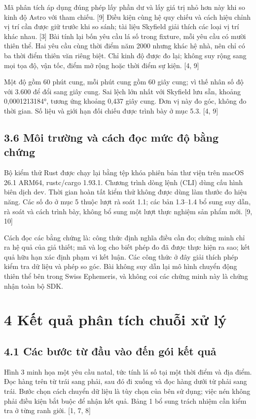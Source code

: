 \documentclass[11pt,a4paper]{article}
\begin{document}
Mã phân tích áp dụng đúng phép lấy phần dư và lấy giá trị nhỏ hơn này khi so kinh độ Astro với tham chiếu. [9] Điều kiện cùng hệ quy chiếu và cách hiệu chỉnh vị trí cần được giữ trước khi so sánh; tài liệu Skyfield giải thích các loại vị trí khác nhau. [3] Bài tính lại bốn yêu cầu lá số trong fixture, mỗi yêu cầu có mười thiên thể. Hai yêu cầu cùng thời điểm năm 2000 nhưng khác hệ nhà, nên chỉ có ba thời điểm thiên văn riêng biệt. Chỉ kinh độ được đo lại; không suy rộng sang mọi tọa độ, vận tốc, điểm mở rộng hoặc thời điểm sự kiện. [4, 9]


Một độ gồm 60 phút cung, mỗi phút cung gồm 60 giây cung; vì thế nhân số độ với 3.600 để đổi sang giây cung. Sai lệch lớn nhất với Skyfield lưu sẵn, khoảng 0,0001213184°, tương ứng khoảng 0,437 giây cung. Đơn vị này đo góc, không đo thời gian. Số liệu và giới hạn đối chiếu được trình bày ở mục 5.3. [4, 9]


\subsection*{3.6 Môi trường và cách đọc mức độ bằng chứng}
Bộ kiểm thử Rust được chạy lại bằng tệp khóa phiên bản thư viện trên macOS 26.1 ARM64, rustc/\allowbreak{}cargo 1.93.1. Chương trình dòng lệnh (CLI) dùng cấu hình biên dịch dev. Thời gian hoàn tất kiểm thử không được dùng làm thước đo hiệu năng. Các số đo ở mục 5 thuộc lượt rà soát 1.1; các bản 1.3–1.4 bổ sung suy dẫn, rà soát và cách trình bày, không bổ sung một lượt thực nghiệm sản phẩm mới. [9, 10]


Cách đọc các bằng chứng là: công thức định nghĩa điều cần đo; chứng minh chỉ ra hệ quả của giả thiết; mã và log cho biết phép đo đã được thực hiện ra sao; kết quả hữu hạn xác định phạm vi kết luận. Các công thức ở đây giải thích phép kiểm tra dữ liệu và phép so góc. Bài không suy dẫn lại mô hình chuyển động thiên thể bên trong Swiss Ephemeris, và không coi các chứng minh này là chứng nhận toàn bộ SDK.


\section*{4 Kết quả phân tích chuỗi xử lý}
\subsection*{4.1 Các bước từ đầu vào đến gói kết quả}
Hình 3 minh họa một yêu cầu natal, tức tính lá số tại một thời điểm và địa điểm. Đọc hàng trên từ trái sang phải, sau đó đi xuống và đọc hàng dưới từ phải sang trái. Bước chọn cách chuyển dữ liệu là tùy chọn của bên sử dụng; việc nén không phải điều kiện bắt buộc để nhận kết quả. Bảng 1 bổ sung trách nhiệm cần kiểm tra ở từng ranh giới. [1, 7, 8]
\end{document}
